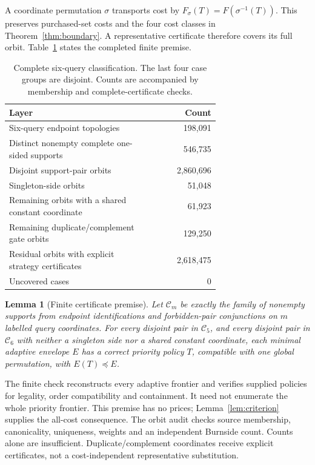 \documentclass[pdflatex,sn-mathphys-num]{sn-jnl}
\theoremstyle{thmstyleone}
\newtheorem{lemma}[theorem]{Lemma}
\theoremstyle{thmstylethree}
\theoremstyle{thmstyletwo}
\begin{document}
A coordinate permutation $\sigma$ transports cost by $F_\sigma(T)=F(\sigma^{-1}(T))$. This preserves purchased-set costs and the four cost classes in Theorem~\ref{thm:boundary}. A representative certificate therefore covers its full orbit. Table~\ref{tab:coverage} states the completed finite premise.

\begin{table}[ht]
\centering\small
\begin{tabular}{@{}p{0.69\linewidth}r@{}}
\toprule
Layer & Count\\\midrule
Six-query endpoint topologies & 198,091\\
Distinct nonempty complete one-sided supports & 546,735\\
Disjoint support-pair orbits & 2,860,696\\
Singleton-side orbits & 51,048\\
Remaining orbits with a shared constant coordinate & 61,923\\
Remaining duplicate/complement gate orbits & 129,250\\
Residual orbits with explicit strategy certificates & 2,618,475\\
Uncovered cases & 0\\\bottomrule
\end{tabular}
\caption{Complete six-query classification. The last four case groups are disjoint. Counts are accompanied by membership and complete-certificate checks.}\label{tab:coverage}
\end{table}

\begin{lemma}[Finite certificate premise]\label{lem:finite}
Let $\mathcal C_m$ be exactly the family of nonempty supports from endpoint identifications and forbidden-pair conjunctions on $m$ labelled query coordinates. For every disjoint pair in $\mathcal C_5$, and every disjoint pair in $\mathcal C_6$ with neither a singleton side nor a shared constant coordinate, each minimal adaptive envelope $E$ has a correct priority policy $T$, compatible with one global permutation, with $E(T)\preceq E$.
\end{lemma}
The finite check reconstructs every adaptive frontier and verifies supplied policies for legality, order compatibility and containment. It need not enumerate the whole priority frontier. This premise has no prices; Lemma~\ref{lem:criterion} supplies the all-cost consequence. The orbit audit checks source membership, canonicality, uniqueness, weights and an independent Burnside count. Counts alone are insufficient. Duplicate/complement coordinates receive explicit certificates, not a cost-independent representative substitution.
\end{document}

